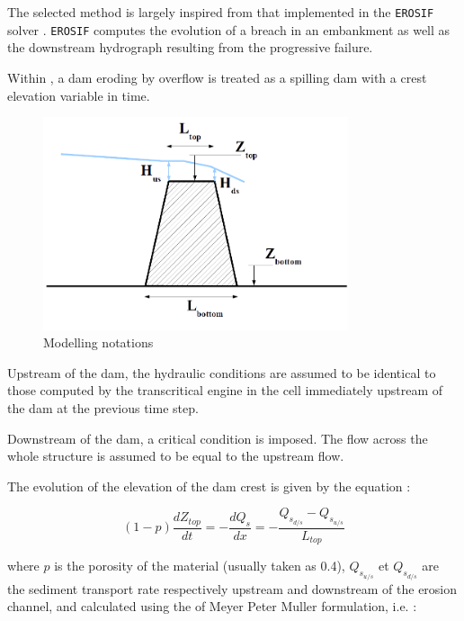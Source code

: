 The selected method is largely inspired from that implemented in the \texttt{EROSIF} solver \cite{BENSLAMA95}. \texttt{EROSIF} computes the evolution of a breach in an embankment as well as the downstream hydrograph resulting from the progressive failure.

Within \mascaret{}, a dam eroding by overflow is treated as a spilling dam with a crest elevation variable in time.

\begin{figure}[H]
    \begin{center}
     \includegraphics[width=0.8\textwidth]{Figures/BarPds.png}
     \caption{Modelling notations}
    \end{center}
\end{figure}

Upstream of the dam, the hydraulic conditions are assumed to be identical to those computed by the transcritical engine in the cell immediately upstream of the dam at the previous time step.

Downstream of the dam, a critical condition is imposed. The flow across the whole structure is assumed to be equal to the upstream flow.

The evolution of the elevation of the dam crest is given by the equation :

\begin{equation}
 (1-p) \frac{dZ_{top}}{dt} = - \frac{dQ_s}{dx} = - \frac{Q_{s_{d/s}}-Q_{s_{u/s}}}{L_{top}}
\end{equation}

where $p$ is the porosity of the material (usually taken as 0.4), $Q_{s_{u/s}}$ et $Q_{s_{d/s}}$ are the sediment transport rate respectively upstream and downstream of the erosion channel, and calculated using the of Meyer Peter Muller formulation, i.e. :

